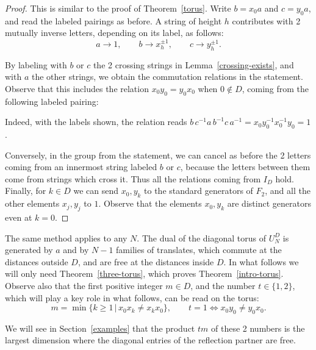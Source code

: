 \documentclass[11pt,a4paper]{article}
\begin{document}
\begin{proof}
This is similar to the proof of Theorem~\ref{torus}. Write $b=x_0a$ and $c=y_0a$, and read the labeled pairings as before. A string of height $h$ contributes with 2 mutually inverse letters, depending on its label, as follows:
\[
 a\to1,\qquad b\to x_h^{\pm1},\qquad c\to y_h^{\pm1}.
\]

By labeling with $b$ or $c$ the 2 crossing strings in Lemma~\ref{crossing-exists}, and with $a$ the other strings, we obtain the commutation relations in the statement. Observe that this includes the relation $x_0y_0=y_0x_0$ when $0\notin D$, coming from the following labeled pairing:
\begin{center}
\end{center}

Indeed, with the labels shown, the relation reads $b\,c^{-1}a\,b^{-1}c\,a^{-1}=x_0y_0^{-1}x_0^{-1}y_0=1$.

Conversely, in the group from the statement, we can cancel as before the 2 letters coming from an innermost string labeled $b$ or $c$, because the letters between them come from strings which cross it. Thus all the relations coming from $I_D$ hold. Finally, for $k\in D$ we can send $x_0,y_k$ to the standard generators of $F_2$, and all the other elements $x_j,y_j$ to $1$. Observe that the elements $x_0,y_k$ are distinct generators even at $k=0$.
\end{proof}

The same method applies to any $N$. The dual of the diagonal torus of $U_N^D$ is generated by $a$ and by $N-1$ families of translates, which commute at the distances outside $D$, and are free at the distances inside $D$. In what follows we will only need Theorem~\ref{three-torus}, which proves Theorem~\ref{intro-torus}. Observe also that the first positive integer $m\in D$, and the number $t\in\{1,2\}$, which will play a key role in what follows, can be read on the torus:
\[
 m=\min\big\{k\geq1\,\big|\,x_0x_k\neq x_kx_0\big\},\qquad t=1\iff x_0y_0\neq y_0x_0.
\]

We will see in Section~\ref{examples} that the product $tm$ of these 2 numbers is the largest dimension where the diagonal entries of the reflection partner are free.
\end{document}
